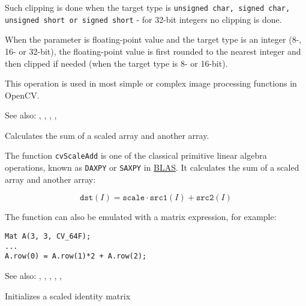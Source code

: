 Such clipping is done when the target type is \texttt{unsigned char, signed char, unsigned short or signed short} - for 32-bit integers no clipping is done.

When the parameter is floating-point value and the target type is an integer (8-, 16- or 32-bit), the floating-point value is first rounded to the nearest integer and then clipped if needed (when the target type is 8- or 16-bit).

This operation is used in most simple or complex image processing functions in OpenCV.

See also: , , , , 

Calculates the sum of a scaled array and another array.

\begin{description}
\end{description}

The function \texttt{cvScaleAdd} is one of the classical primitive linear algebra operations, known as \texttt{DAXPY} or \texttt{SAXPY} in \href{http://en.wikipedia.org/wiki/Basic_Linear_Algebra_Subprograms}{BLAS}. It calculates the sum of a scaled array and another array:

\[
\texttt{dst}(I)=\texttt{scale} \cdot \texttt{src1}(I) + \texttt{src2}(I)
\]

The function can also be emulated with a matrix expression, for example:

\begin{lstlisting}
Mat A(3, 3, CV_64F);
...
A.row(0) = A.row(1)*2 + A.row(2);
\end{lstlisting}

See also: , , , , , 

Initializes a scaled identity matrix

